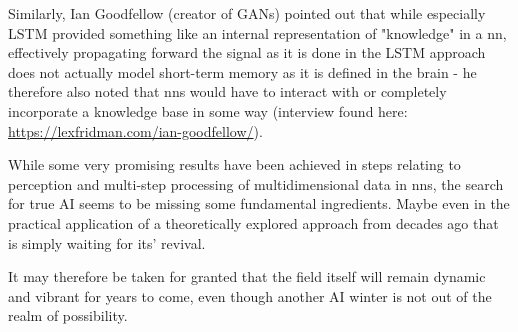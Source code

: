 Similarly, Ian Goodfellow (creator of \acp{GAN}) pointed out that while especially \ac{LSTM} provided something like an internal representation of "knowledge" in a \ac{nn}, effectively propagating forward the signal as it is done in the \ac{LSTM} approach does not actually model short-term memory as it is defined in the brain - he therefore also noted that \acp{nn} would have to interact with or completely incorporate a knowledge base in some way (interview found here: \url{https://lexfridman.com/ian-goodfellow/}).

While some very promising results have been achieved in steps relating to perception and multi-step processing of multidimensional data in \acp{nn}, the search for true \ac{AI} seems to be missing some fundamental ingredients. Maybe even in the practical application of a theoretically explored approach from decades ago that is simply waiting for its' revival.

It may therefore be taken for granted that the field itself will remain dynamic and vibrant for years to come, even though another \ac{AI} winter is not out of the realm of possibility.
